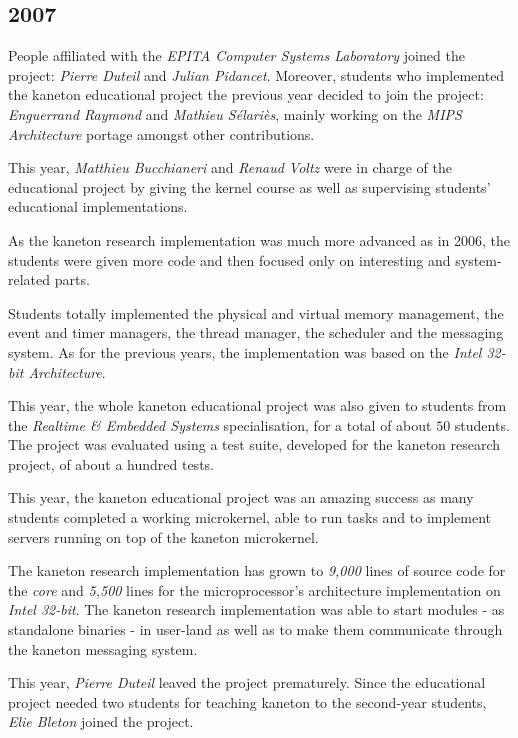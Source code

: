 \begin{multicols}{2}
%
%

\subsection{2007}

People affiliated with the \textit{EPITA Computer Systems Laboratory} joined
the project: \textit{Pierre Duteil} and \textit{Julian Pidancet}. Moreover,
students who implemented the kaneton educational project the previous year
decided to join the project: \textit{Enguerrand Raymond} and \textit{Mathieu
S\'elari\`es}, mainly working on the \textit{MIPS Architecture} portage amongst
other contributions.

This year, \textit{Matthieu Bucchianeri} and \textit{Renaud Voltz} were in
charge of the educational project by giving the kernel course as well
as supervising students' educational implementations.

As the kaneton research implementation was much more advanced as in 2006,
the students were given more code and then focused only on interesting and
system-related parts.

Students totally implemented the physical and virtual memory management, the
event and timer managers, the thread manager, the scheduler and the messaging
system. As for the previous years, the implementation was based on the
\textit{Intel 32-bit Architecture}.

This year, the whole kaneton educational project was also given to students
from the \textit{Realtime \& Embedded Systems} specialisation, for a total
of about $50$ students. The project was evaluated using a test suite,
developed for the kaneton research project, of about a hundred tests.

This year, the kaneton educational project was an amazing success as many
students completed a working microkernel, able to run tasks and to implement
servers running on top of the kaneton microkernel.

The kaneton research implementation has grown to \textit{9,000} lines of source
code for the \textit{core} and \textit{5,500} lines for the microprocessor's
architecture implementation on \textit{Intel 32-bit}. The kaneton research
implementation was able to start modules - as standalone binaries - in
user-land as well as to make them communicate through the kaneton messaging
system.

This year, \textit{Pierre Duteil} leaved the project prematurely. Since the
educational project needed two students for teaching kaneton to the second-year
students, \textit{Elie Bleton} joined the project.


\end{multicols}
